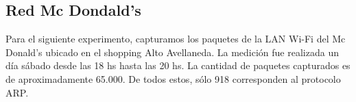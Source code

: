 \subsection{Red Mc Dondald's}

Para el siguiente experimento, capturamos los paquetes de la LAN Wi-Fi del Mc Donald's ubicado en el shopping Alto Avellaneda. La medición fue realizada un día sábado desde las 18 hs hasta las 20 hs. La cantidad de paquetes capturados es de aproximadamente 65.000. De todos estos, sólo 918 corresponden al protocolo ARP.

